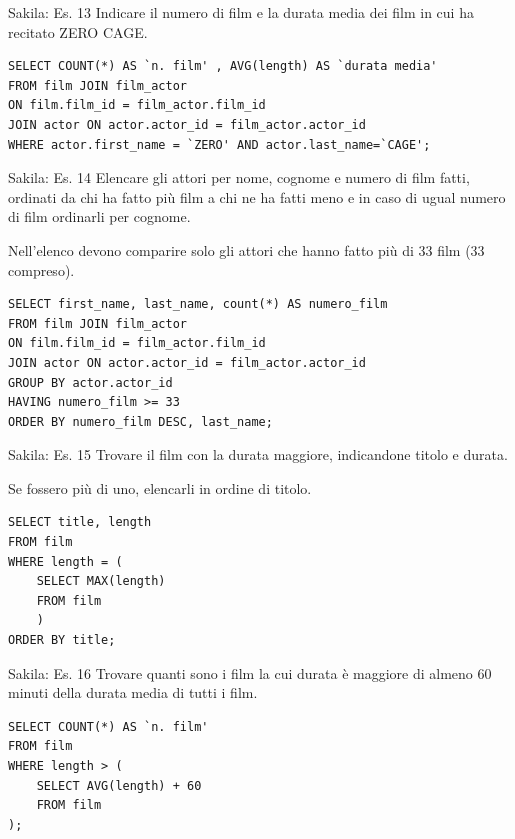 %
\begin{frame}[fragile]{Sakila: Es. 13}
\vspace{.5cm}
Indicare il numero di film e la durata media dei film in cui ha recitato ZERO CAGE.
\pause
\begin{lstlisting}
SELECT COUNT(*) AS `n. film' , AVG(length) AS `durata media'
FROM film JOIN film_actor
ON film.film_id = film_actor.film_id 
JOIN actor ON actor.actor_id = film_actor.actor_id
WHERE actor.first_name = `ZERO' AND actor.last_name=`CAGE';
\end{lstlisting}
\end{frame}
%
\begin{frame}[fragile]{Sakila: Es. 14}
Elencare gli attori per nome, cognome e numero di film fatti, ordinati da chi ha fatto pi\`u film a chi ne ha fatti meno e in caso di ugual numero di film ordinarli per cognome.

Nell'elenco devono comparire solo gli attori che hanno fatto pi\`u di 33 film (33 compreso).
\pause
\begin{lstlisting}
SELECT first_name, last_name, count(*) AS numero_film
FROM film JOIN film_actor
ON film.film_id = film_actor.film_id 
JOIN actor ON actor.actor_id = film_actor.actor_id
GROUP BY actor.actor_id
HAVING numero_film >= 33
ORDER BY numero_film DESC, last_name;
\end{lstlisting}
\end{frame}
%
\begin{frame}[fragile]{Sakila: Es. 15}
Trovare il film con la durata maggiore, indicandone titolo e durata.

Se fossero pi\`u di uno, elencarli in ordine di titolo.
\pause
\begin{lstlisting}
SELECT title, length
FROM film
WHERE length = (
    SELECT MAX(length)
    FROM film
    )
ORDER BY title;
\end{lstlisting}
\end{frame}
%
\begin{frame}[fragile]{Sakila: Es. 16}
Trovare quanti sono i film la cui durata \`e maggiore di almeno 60 minuti della durata media di tutti i film.
\pause
\begin{lstlisting}
SELECT COUNT(*) AS `n. film'
FROM film
WHERE length > (
    SELECT AVG(length) + 60
    FROM film
);
\end{lstlisting}
\end{frame}
%